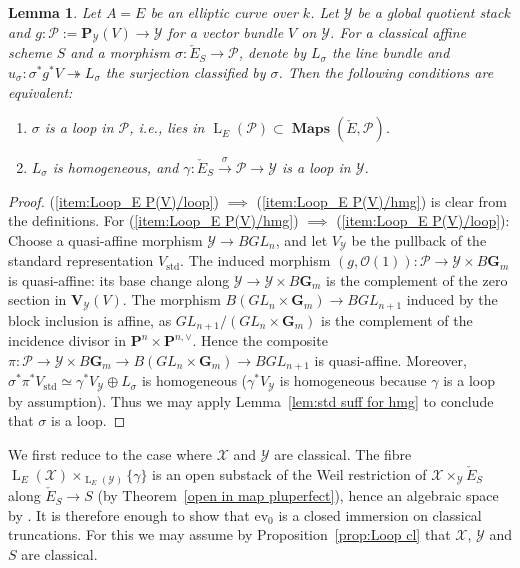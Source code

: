 \documentclass[12pt, oneside]{amsart}
\newcommand{\itemref}[1]{(\ref{#1})}
\numberwithin{equation}{section}
\newtheorem{lemma}[subsubsection]{Lemma}
\theoremstyle{remark}
\theoremstyle{plain}
\DeclareMathOperator{\MAP}{\mathbf{Maps}}
\newcommand{\Loop}{\operatorname{L}}
\newcommand{\OO}{\mathcal{O}}
\newcommand{\YY}{\mathcal{Y}}
\newcommand{\XX}{\mathcal{X}}
\newcommand{\GGm}{\mathbf{G}_{m}}
\newcommand{\ev}{\mathrm{ev}}
\begin{document}
\begin{lemma}\label{lem:Loop_E P(V)}
	Let $A = E$ be an elliptic curve over $k$.
	Let $\YY$ be a global quotient stack and $g : \mathcal{P} := \mathbf{P}_{\YY}(V) \to \YY$ for a vector bundle $V$ on $\YY$.
	For a classical affine scheme $S$ and a morphism $\sigma : \check{E}_S \to \mathcal{P}$, denote by $L_\sigma$ the line bundle and $u_\sigma : \sigma^*g^*V \twoheadrightarrow L_\sigma$ the surjection classified by $\sigma$.
	Then the following conditions are equivalent:
	\begin{enumerate}
	  \item\label{item:Loop_E P(V)/loop} $\sigma$ is a loop in $\mathcal{P}$, i.e., lies in $\Loop_E(\mathcal{P}) \subset \MAP(\check{E}, \mathcal{P})$.
		\item\label{item:Loop_E P(V)/hmg} $L_\sigma$ is homogeneous, and $\gamma : \check{E}_S \xrightarrow{\sigma} \mathcal{P} \to \YY$ is a loop in $\YY$.
	\end{enumerate}
\end{lemma}
\begin{proof}
  \itemref{item:Loop_E P(V)/loop} $\implies$ \itemref{item:Loop_E P(V)/hmg} is clear from the definitions.
  For \itemref{item:Loop_E P(V)/hmg} $\implies$ \itemref{item:Loop_E P(V)/loop}:
  Choose a quasi-affine morphism $\YY \to BGL_n$, and let $V_{\YY}$ be the pullback of the standard representation $V_{\mathrm{std}}$.
  The induced morphism $(g, \OO(1)) : \mathcal{P} \to \YY \times B\GGm$ is quasi-affine: its base change along $\YY \to \YY \times B\GGm$ is the complement of the zero section in $\mathbf{V}_{\YY}(V)$.
  The morphism $B(GL_n \times \GGm) \to BGL_{n+1}$ induced by the block inclusion is affine, as $GL_{n+1}/(GL_n \times \GGm)$ is the complement of the incidence divisor in $\mathbf{P}^n \times \mathbf{P}^{n,\vee}$.
  Hence the composite $\pi : \mathcal{P} \to \YY \times B\GGm \to B(GL_n \times \GGm) \to BGL_{n+1}$ is quasi-affine.
  Moreover, $\sigma^*\pi^*V_{\mathrm{std}} \simeq \gamma^*V_{\YY} \oplus L_\sigma$ is homogeneous ($\gamma^*V_{\YY}$ is homogeneous because $\gamma$ is a loop by assumption).
  Thus we may apply Lemma~\ref{lem:std suff for hmg} to conclude that $\sigma$ is a loop.
\end{proof}

We first reduce to the case where $\XX$ and $\YY$ are classical.
The fibre $\Loop_E(\XX) \times_{\Loop_E(\YY)} \{\gamma\}$ is an open substack of the Weil restriction of $\XX \times_{\YY} \check{E}_S$ along $\check{E}_S \to S$ (by Theorem~\ref{open in map pluperfect}), hence an algebraic space by \cite[Thm.~19.1.0.1]{SAG}.
It is therefore enough to show that $\ev_0$ is a closed immersion on classical truncations.
For this we may assume by Proposition~\ref{prop:Loop cl} that $\XX$, $\YY$ and $S$ are classical.
\end{document}
